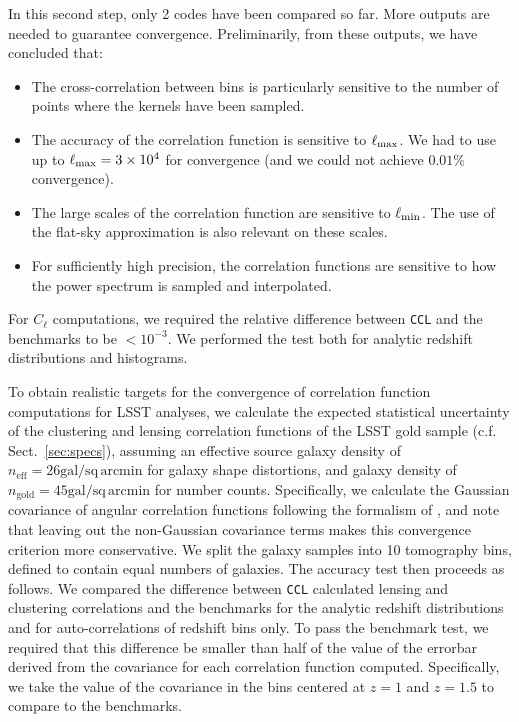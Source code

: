 \documentclass[\docopts]{\docclass}
\newcommand{\ccl}{{\tt CCL}\xspace}
\begin{document}
In this second step, only 2 codes have been compared so far. More outputs are needed to guarantee convergence. Preliminarily, from these outputs, we have concluded that:
\begin{itemize}
\item The cross-correlation between bins is particularly sensitive to the number of points where the kernels have been sampled.
\item The accuracy of the correlation function is sensitive to $\ell_{\rm max}$. We had to use up to $\ell_{\rm max}=3\times10^4$ for convergence (and we could not achieve $0.01\%$ convergence).
\item The large scales of the correlation function are sensitive to $\ell_{\rm min}$. The use of the flat-sky approximation is also relevant on these scales.
\item For sufficiently high precision, the correlation functions are sensitive to how the power spectrum is sampled and interpolated.
\end{itemize}

For $C_\ell$ computations, we required the relative difference between \ccl and the benchmarks to be $<10^{-3}$. We performed the test both for analytic redshift distributions and histograms.

To obtain realistic targets for the convergence of correlation function computations for LSST analyses, we calculate the expected statistical uncertainty of the clustering and lensing correlation functions of the LSST gold sample (c.f. Sect.~\ref{sec:specs}), assuming an effective source galaxy density of $n_\mathrm{eff} = 26\mathrm{gal/sq\,arcmin}$ for galaxy shape distortions, and galaxy density of $n_\mathrm{gold} = 45\mathrm{gal/sq\,arcmin}$ for number counts. Specifically, we calculate the Gaussian covariance of angular correlation functions following the formalism of \citet{2008A&A...477...43J}, and note that leaving out the non-Gaussian covariance terms makes this convergence criterion more conservative. We split the galaxy samples into 10 tomography bins, defined to contain equal numbers of galaxies. The accuracy test then proceeds as follows. We compared the difference between \ccl calculated lensing and clustering correlations and the benchmarks for the analytic redshift distributions and for auto-correlations of redshift bins only. To pass the benchmark test, we required that this difference be smaller than half of the value of the errorbar derived from the covariance for each correlation function computed. Specifically, we take the value of the covariance in the bins centered at $z=1$ and $z=1.5$ to compare to the benchmarks.
\end{document}
